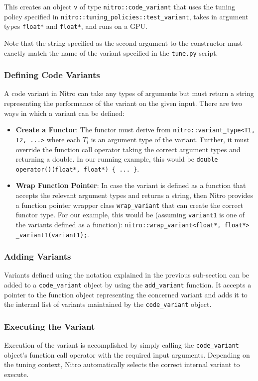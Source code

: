 \documentclass[12pt]{article}
\begin{document}
This creates an object \texttt{v} of type \texttt{nitro::code\_variant}
that uses the tuning policy specified in \texttt{nitro::tuning\_policies::test\_variant},
takes in argument types \texttt{float*} and \texttt{float*}, and runs on a GPU.

Note that the string specified as the second argument to the constructor
must exactly match the name of the variant specified in the \texttt{tune.py} script.

\subsubsection{Defining Code Variants}
A code variant in Nitro can take any types of arguments but must return a string
representing the performance of the variant on the given input. There are two
ways in which a variant can be defined:

\begin{itemize}
\item \textbf{Create a Functor}: The functor must derive from \texttt{nitro::variant\-\_type<T1, T2, ...>}
where each $T_i$ is an argument type of the variant. Further, it must override the function call
operator taking the correct argument types and returning a double. In our running example, this would
be \texttt{double operator()(float*, float*) \{ ... \}}.

\item \textbf{Wrap Function Pointer}: In case the variant is defined as a function that
accepts the relevant argument types and returns a string, then Nitro provides a function pointer wrapper
class \texttt{wrap\_variant} that can create the correct functor type. For our example, this would
be (assuming \texttt{variant1} is one of the variants defined as a function):
\texttt{nitro::wrap\_variant<float*, float*> \_variant1(variant1);}.
\end{itemize}

\subsubsection{Adding Variants}
Variants defined using the notation explained in the previous sub-section can be added to
a \texttt{code\_variant} object by using the \texttt{add\_variant} function. It accepts
a pointer to the function object representing the concerned variant and adds it to the internal
list of variants maintained by the \texttt{code\_variant} object.

\subsubsection{Executing the Variant}
Execution of the variant is accomplished by simply calling the \texttt{code\_variant} object's
function call operator with the required input arguments. Depending on the tuning context, Nitro
automatically selects the correct internal variant to execute.
\end{document}
